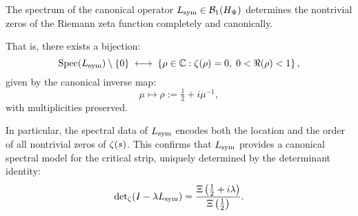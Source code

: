 \begin{corollary}
\label{cor:spectral_determines_zeta}

The spectrum of the canonical operator \( L_{\mathrm{sym}} \in \mathcal{B}_1(H_{\Psi}) \) determines the nontrivial zeros of the Riemann zeta function completely and canonically.

That is, there exists a bijection:
\[
\operatorname{Spec}(L_{\mathrm{sym}}) \setminus \{0\}
\;\longleftrightarrow\;
\left\{ \rho \in \mathbb{C} : \zeta(\rho) = 0, \; 0 < \Re(\rho) < 1 \right\},
\]
given by the canonical inverse map:
\[
\mu \mapsto \rho := \tfrac{1}{2} + i \mu^{-1},
\]
with multiplicities preserved.

\medskip

\noindent
In particular, the spectral data of \( L_{\mathrm{sym}} \) encodes both the location and the order of all nontrivial zeros of \( \zeta(s) \). This confirms that \( L_{\mathrm{sym}} \) provides a canonical spectral model for the critical strip, uniquely determined by the determinant identity:
\[
\det\nolimits_\zeta(I - \lambda L_{\mathrm{sym}}) = \frac{\Xi\left( \tfrac{1}{2} + i\lambda \right)}{\Xi\left( \tfrac{1}{2} \right)}.
\]
\end{corollary}
